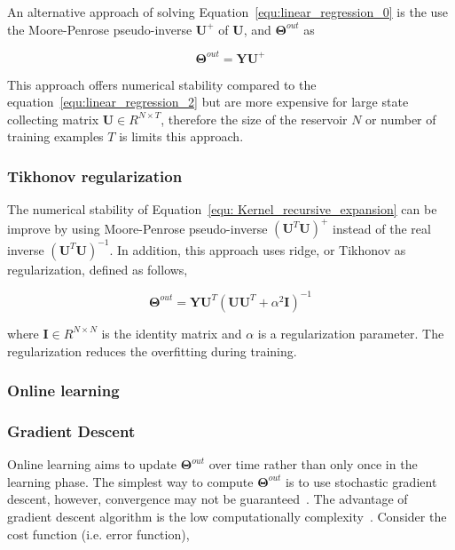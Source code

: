 \documentclass{WitsPhysicsReport}
\begin{document}
 An alternative approach of solving Equation~\ref{equ:linear_regression_0} is the use the  Moore-Penrose pseudo-inverse  $ \mathbf{U}^{+}$ of $\mathbf{U}$, and $\mathbf{\Theta}^{out}$ as
 
\begin{equation}
\mathbf{\Theta}^{out} = \mathbf{Y} \mathbf{U}^{+}
\label{equ:Pseudo-inverse_0}
\end{equation}

This approach offers numerical stability compared to the equation~\ref{equ:linear_regression_2} but are more expensive for large state collecting matrix $\mathbf{U} \in R^{N \times T}$, therefore the size of the reservoir $N$ or number of training examples $T$ is limits this approach.

\subsubsection{Tikhonov regularization}
\label{sec:tikhonov_regularization}

The numerical stability of Equation~\ref{equ: Kernel_recursive_expansion} can be improve by using Moore-Penrose pseudo-inverse $(\mathbf{U}^{T} \mathbf{U})^{+}$ instead of the real inverse $(\mathbf{U}^{T} \mathbf{U})^{-1}$. In addition, this approach uses ridge, or Tikhonov as regularization, defined as follows,

\begin{equation}
 \mathbf{\Theta}^{out}  = \mathbf{Y} \mathbf{U}^{T} (\mathbf{U} \mathbf{U}^{T} + {\alpha}^{2} \mathbf{I})^{-1}
\label{equ:tikhonov_regularization}
\end{equation}

where $\mathbf{I} \in R^{N \times N} $ is the identity matrix and $\alpha$ is a regularization parameter. The regularization reduces the overfitting during training.

\subsubsection{Online learning}
\label{sec:Online_learning}


\subsubsection{Gradient Descent}
\label{sec:gradient_descent}

Online learning aims to update $\mathbf{\Theta}^{out}$ over time rather than only once in the learning phase. The simplest way to compute 
$\mathbf{\Theta}^{out}$  is to use stochastic gradient descent, however, convergence may not be guaranteed~\cite{lukovsevivcius2009reservoir}. The advantage of gradient descent algorithm is the low computationally complexity~\cite{kountouriotis2005multi}. Consider the cost function (i.e. error function),
\end{document}
